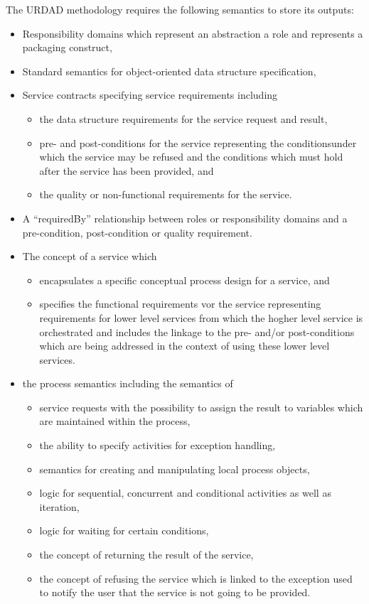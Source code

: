 The URDAD methodology requires the following semantics to store its outputs:
\begin{itemize}
  \item Responsibility domains which represent an abstraction a role and represents a packaging construct,
  \item Standard semantics for object-oriented data structure specification,
  \item Service contracts specifying service requirements including
    \begin{itemize}
      \item the data structure requirements for the service request and result,
      \item pre- and post-conditions for the service representing the conditionsunder which the service may be refused and the conditions which must hold after the service has been provided, and
      \item the quality or non-functional requirements for the service.
     \end{itemize}
  \item A ``requiredBy'' relationship between roles or responsibility domains and a pre-condition, post-condition or quality requirement.
  \item The concept of a service which 
    \begin{itemize}
      \item encapsulates a specific conceptual process design for a service, and 
      \item specifies the functional requirements vor the service representing requirements for lower level services from which the hogher level service is orchestrated and includes the linkage to the pre- and/or post-conditions which are being addressed in the context of using these lower level services.
    \end{itemize}
  \item the process semantics including the semantics of 
    \begin{itemize}
      \item service requests with the possibility to assign the result to variables which are maintained within the process,
      \item the ability to specify activities for exception handling,
      \item semantics for creating and manipulating local process objects,
      \item logic for sequential, concurrent and conditional activities as well as iteration,
      \item logic for waiting for certain conditions,
      \item the concept of returning the result of the service,
      \item the concept of refusing the service which is linked to the exception used to notify the user that the service is not going to be provided.
    \end{itemize}
\end{itemize}

